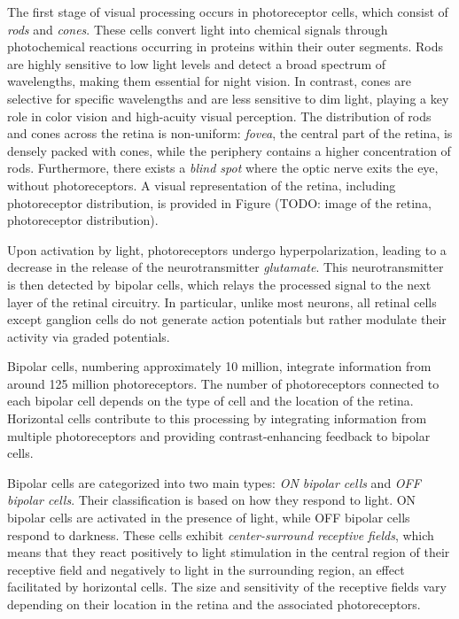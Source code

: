The first stage of visual processing occurs in photoreceptor cells,
which consist of \emph{rods} and \emph{cones}. These cells convert light into
chemical signals through photochemical reactions occurring in proteins within
their outer segments. Rods are highly sensitive to low light levels and detect
a broad spectrum of wavelengths, making them essential for night vision. 
In contrast, cones are selective for specific wavelengths and are less sensitive
to dim light, playing a key role in color vision and high-acuity visual perception. 
The distribution of rods and cones across the retina is non-uniform: \emph{fovea},
the central part of the retina, is densely packed with cones, while the periphery
contains a higher concentration of rods. Furthermore, there exists a \emph{blind spot} 
where the optic nerve exits the eye, without photoreceptors. A visual representation
of the retina, including photoreceptor distribution, is provided in Figure
(TODO: image of the retina, photoreceptor distribution).

Upon activation by light, photoreceptors undergo hyperpolarization, leading to a decrease
in the release of the neurotransmitter \emph{glutamate}. This neurotransmitter is then
detected by bipolar cells, which relays the processed signal to the next layer of the
retinal circuitry. In particular, unlike most neurons, all retinal cells except ganglion
cells do not generate action potentials but rather modulate their activity via graded potentials.

Bipolar cells, numbering approximately 10 million, integrate information from around
125 million photoreceptors. The number of photoreceptors connected to each bipolar
cell depends on the type of cell and the location of the retina. Horizontal cells contribute 
to this processing by integrating information from multiple photoreceptors and
providing contrast-enhancing feedback to bipolar cells.

Bipolar cells are categorized into two main types: \emph{ON bipolar cells} 
and \emph{OFF bipolar cells}. Their classification is based on how they 
respond to light. ON bipolar cells are activated in the presence of light, 
while OFF bipolar cells respond to darkness. These cells exhibit
\emph{center-surround receptive fields}, which means that they react positively to light
stimulation in the central region of their receptive field and negatively to
light in the surrounding region, an effect facilitated by horizontal cells. 
The size and sensitivity of the receptive fields vary depending on their location in the retina and the associated photoreceptors.

